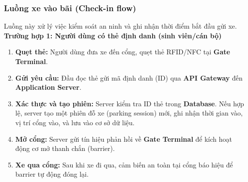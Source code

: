 \subsubsection{Luồng xe vào bãi (Check-in flow)}
Luồng này xử lý việc kiểm soát an ninh và ghi nhận thời điểm bắt đầu gửi xe.
\textbf{Trường hợp 1: Người dùng có thẻ định danh (sinh viên/cán bộ)}
\begin{enumerate}
    \item \textbf{Quẹt thẻ:} Người dùng đưa xe đến cổng, quẹt thẻ RFID/NFC tại \textbf{Gate Terminal}.
    \item \textbf{Gửi yêu cầu:} Đầu đọc thẻ gửi mã định danh (ID) qua \textbf{API Gateway} đến \textbf{Application Server}.
    \item \textbf{Xác thực và tạo phiên:} Server kiểm tra ID thẻ trong \textbf{Database}. Nếu hợp lệ, server tạo một phiên đỗ xe (parking session) mới, ghi nhận thời gian vào, vị trí cổng vào, và lưu vào cơ sở dữ liệu.
    \item \textbf{Mở cổng:} Server gửi tín hiệu phản hồi về \textbf{Gate Terminal} để kích hoạt động cơ mở thanh chắn (barrier).
    \item \textbf{Xe qua cổng:} Sau khi xe đi qua, cảm biến an toàn tại cổng báo hiệu để barrier tự động đóng lại.
\end{enumerate}

